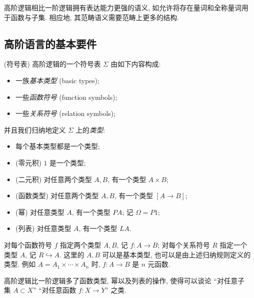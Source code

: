 高阶逻辑相比一阶逻辑拥有表达能力更强的语义, 如允许将存在量词和全称量词用于函数与子集. 相应地, 其范畴语义需要范畴上更多的结构.

\subsection{高阶语言的基本要件}


\begin{definition}
	{(符号表)}
	高阶逻辑的一个符号表 $\Sigma$ 由如下内容构成:
	\begin{itemize}
		\item 一族\emph{基本类型} (basic types);
		\item 一些\emph{函数符号} (function symbols);
		\item 一些\emph{关系符号} (relation symbols);
	\end{itemize}
	并且我们归纳地定义 $\Sigma$ 上的\emph{类型}:
	\begin{itemize}
		\item 每个基本类型都是一个类型;
		\item (零元积) $1$ 是一个类型;
		\item (二元积) 对任意两个类型 $A,B$, 有一个类型 $A\times B$;
		\item (函数类型) 对任意两个类型 $A,B$, 有一个类型 $[A\to B]$;
		\item (幂) 对任意类型 $A$, 有一个类型 $PA$; 记 $\Omega = P1$;
		\item (列表) 对任意类型 $A$, 有一个类型 $LA$.
	\end{itemize}
	对每个函数符号 $f$ 指定两个类型 $A,B$, 记 $f\colon A\to B$;
	对每个关系符号 $R$ 指定一个类型 $A$, 记 $R\hookrightarrow A$.
	这里的 $A,B$ 可以是基本类型, 也可以是由上述归纳规则定义的类型.
	例如 $A=A_1\times \cdots\times A_n$ 时, $f\colon A\to B$ 是 $n$ 元函数.
\end{definition}

高阶逻辑比一阶逻辑多了函数类型, 幂以及列表的操作, 使得可以谈论 ``对任意子集 $A\subset X$'' ``对任意函数 $f\colon X\to Y$'' 之类.



